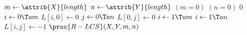 \begin{codebox}
\li $m \gets \attrib{X}{length}$
\li $n \gets \attrib{Y}{length}$
\li \If $(m = 0)$  $(n = 0)$
\li \Then \Return $0$
	\End
\li \For $i \gets 0 \To m$
\li \Do $L[i,0] \gets 0$
	\End
\li \For $j \gets 0 \To n$
\li \Do $L[0,j] \gets 0$
	\End
\li \For $i \gets 1 \To m$
\li \Do \For $i \gets 1 \To n$
\li 	\Do $L[i,j] \gets -1$
		\End
	\End
\li \Return $\proc{R-LCS}(X,Y,m,n)$
\end{codebox}